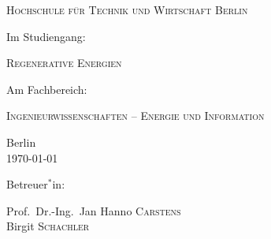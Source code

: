 \begin{titlepage}
	{\scshape\Large Hochschule für Technik und Wirtschaft Berlin \par}
	
	\vspace{1cm}
	
	Im Studiengang:\par
	{\scshape\large Regenerative Energien\par}
	
	\vspace{.5cm}
	
	Am Fachbereich:\par
	{\scshape\large Ingenieurwissenschaften {--} Energie und Information\par}
	
	\vfill
	
	{\large Berlin\\
	\today\par}
	
	\vfill
	
	{\large Betreuer$^*$in:\par
	Prof.~Dr.-Ing.~Jan Hanno \textsc{Carstens}\\
	Birgit \textsc{Schachler}}
\end{titlepage}